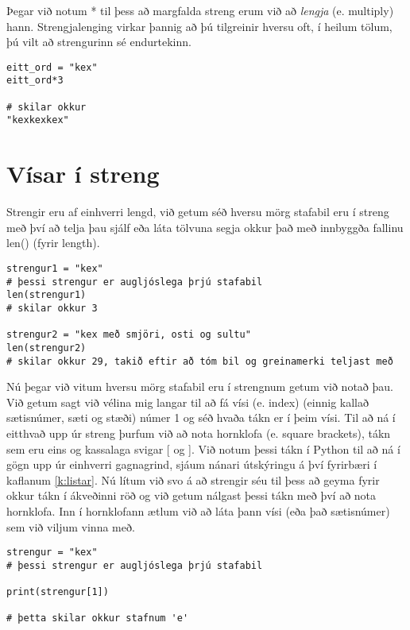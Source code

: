 Þegar við notum * til þess að margfalda streng erum við að \textit{lengja} (e. multiply) hann.
Strengjalenging virkar þannig að þú tilgreinir hversu oft, í heilum tölum, þú vilt að strengurinn sé endurtekinn.

\begin{lstlisting}[caption=Strengjalenging]
eitt_ord = "kex"
eitt_ord*3

# skilar okkur
"kexkexkex"
\end{lstlisting}

\section{Vísar í streng}
Strengir eru af einhverri lengd, við getum séð hversu mörg stafabil eru í streng með því að telja þau sjálf eða láta tölvuna segja okkur það með innbyggða fallinu len() (fyrir length).

\begin{lstlisting}[caption=Stafabilafjöldi, label=lst:stafabil]
strengur1 = "kex"
# þessi strengur er augljóslega þrjú stafabil
len(strengur1) 
# skilar okkur 3

strengur2 = "kex með smjöri, osti og sultu"
len(strengur2)
# skilar okkur 29, takið eftir að tóm bil og greinamerki teljast með
\end{lstlisting}

Nú þegar við vitum hversu mörg stafabil eru í strengnum getum við notað þau.
Við getum sagt við vélina mig langar til að fá vísi (e. index) (einnig kallað sætisnúmer, sæti og stæði) númer 1 og séð hvaða tákn er í þeim vísi.
Til að ná í eitthvað upp úr streng þurfum við að nota hornklofa (e. square brackets), tákn sem eru eins og kassalaga svigar [ og ].
Við notum þessi tákn í Python til að ná í gögn upp úr einhverri gagnagrind, sjáum nánari útskýringu á því fyrirbæri í kaflanum \ref{k:listar}.
Nú lítum við svo á að strengir séu til þess að geyma fyrir okkur tákn í ákveðinni röð og við getum nálgast þessi tákn með því að nota hornklofa.
Inn í hornklofann ætlum við að láta þann vísi (eða það sætisnúmer) sem við viljum vinna með.

\begin{lstlisting}[caption=Vísir 1, label=lst:stafbil2]
strengur = "kex"
# þessi strengur er augljóslega þrjú stafabil

print(strengur[1])

# þetta skilar okkur stafnum 'e'
\end{lstlisting}

